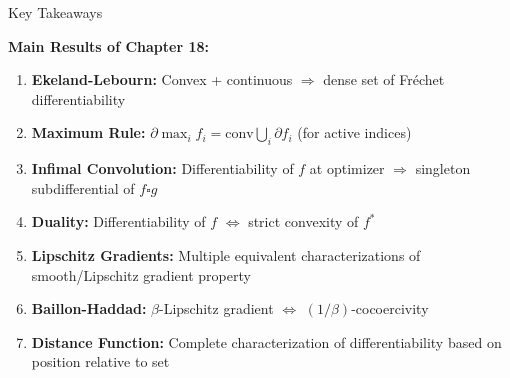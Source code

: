 \documentclass[aspectratio=169,10pt]{beamer}
\theoremstyle{definition}
\begin{document}
\begin{frame}{Key Takeaways}

\textbf{Main Results of Chapter 18:}

\begin{enumerate}
  \item[\textbf{(i)}] \textbf{Ekeland-Lebourn:} Convex + continuous $\Rightarrow$
        dense set of Fréchet differentiability

  \item[\textbf{(ii)}] \textbf{Maximum Rule:} $\partial \max_i f_i = \text{conv} \bigcup_i \partial f_i$
        (for active indices)

  \item[\textbf{(iii)}] \textbf{Infimal Convolution:} Differentiability of $f$ at optimizer
        $\Rightarrow$ singleton subdifferential of $f \square g$

  \item[\textbf{(iv)}] \textbf{Duality:} Differentiability of $f$ $\Leftrightarrow$
        strict convexity of $f^*$

  \item[\textbf{(v)}] \textbf{Lipschitz Gradients:} Multiple equivalent characterizations
        of smooth/Lipschitz gradient property

  \item[\textbf{(vi)}] \textbf{Baillon-Haddad:} $\beta$-Lipschitz gradient $\Leftrightarrow$
        $(1/\beta)$-cocoercivity

  \item[\textbf{(vii)}] \textbf{Distance Function:} Complete characterization of differentiability
        based on position relative to set
\end{enumerate}

\end{frame}
\end{document}
